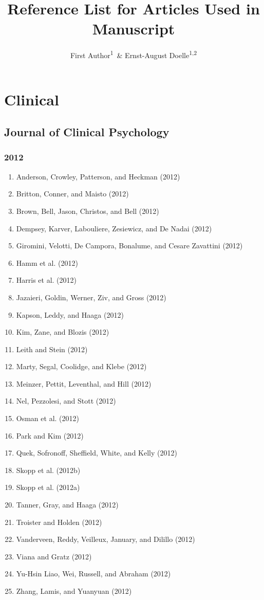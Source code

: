 \documentclass[english,man]{apa6}
\title{Reference List for Articles Used in Manuscript}
\author{First Author\textsuperscript{1}~\& Ernst-August Doelle\textsuperscript{1,2}}
\affiliation{
    \vspace{0.5cm}
          \textsuperscript{1} Wilhelm-Wundt-University\\
          \textsuperscript{2} Konstanz Business School  }
\providecommand{\tightlist}{%
  \setlength{\itemsep}{0pt}\setlength{\parskip}{0pt}}
\begin{document}
\maketitle

\setcounter{secnumdepth}{0}



\section{Clinical}\label{clinical}

\subsection{Journal of Clinical
Psychology}\label{journal-of-clinical-psychology}

\subsubsection{2012}\label{section}

\begin{enumerate}
\def\labelenumi{\arabic{enumi})}
\tightlist
\item
  Anderson, Crowley, Patterson, and Heckman (2012)
\item
  Britton, Conner, and Maisto (2012)
\item
  Brown, Bell, Jason, Christos, and Bell (2012)
\item
  Dempsey, Karver, Labouliere, Zesiewicz, and De Nadai (2012)
\item
  Giromini, Velotti, De Campora, Bonalume, and Cesare Zavattini (2012)
\item
  Hamm et al. (2012)
\item
  Harris et al. (2012)
\item
  Jazaieri, Goldin, Werner, Ziv, and Gross (2012)
\item
  Kapson, Leddy, and Haaga (2012)
\item
  Kim, Zane, and Blozis (2012)
\item
  Leith and Stein (2012)
\item
  Marty, Segal, Coolidge, and Klebe (2012)
\item
  Meinzer, Pettit, Leventhal, and Hill (2012)
\item
  Nel, Pezzolesi, and Stott (2012)
\item
  Osman et al. (2012)
\item
  Park and Kim (2012)
\item
  Quek, Sofronoff, Sheffield, White, and Kelly (2012)
\item
  Skopp et al. (2012b)
\item
  Skopp et al. (2012a)
\item
  Tanner, Gray, and Haaga (2012)
\item
  Troister and Holden (2012)
\item
  Vanderveen, Reddy, Veilleux, January, and Dilillo (2012)
\item
  Viana and Gratz (2012)
\item
  Yu-Hsin Liao, Wei, Russell, and Abraham (2012)
\item
  Zhang, Lamis, and Yuanyuan (2012)
\end{enumerate}
\end{document}
